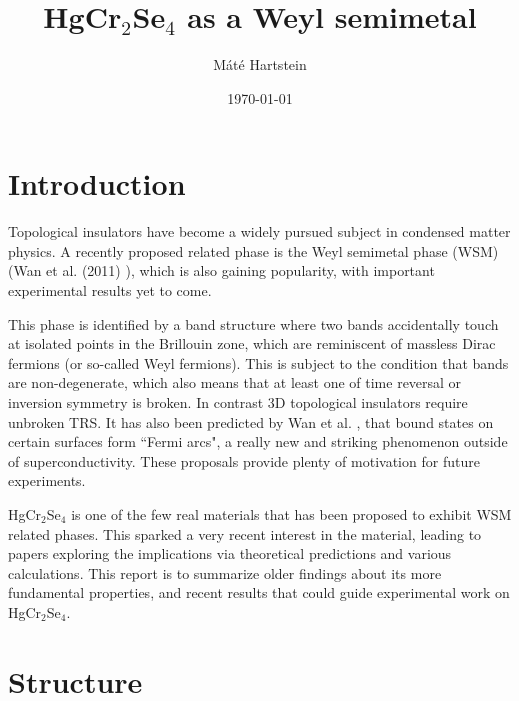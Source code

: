 \documentclass[preprint,pre,floats,aps,amsmath,amssymb]{revtex4}
\begin{document}
\title{HgCr$_2$Se$_4$ as a Weyl semimetal}
\author{M\'{a}t\'{e} Hartstein}
\date{\today}

\clearpage\maketitle
\thispagestyle{empty}


\section{Introduction}
\label{sec:intro}

Topological insulators have become a widely pursued subject in condensed matter physics. A recently proposed related phase is the Weyl semimetal phase (WSM) (Wan et al. (2011) \cite{wan}), which is also gaining popularity, with important experimental results yet to come.
 
This phase is identified by a band structure where two bands accidentally touch at isolated points in the Brillouin zone, which are reminiscent of massless Dirac fermions (or so-called Weyl fermions). This is subject to the condition that bands are non-degenerate, which also means that at least one of time reversal or inversion symmetry is broken. In contrast 3D topological insulators require unbroken TRS.
It has also been predicted by Wan et al. \cite{wan}, that bound states on certain surfaces form ``{Fermi arcs}", a really new and striking phenomenon outside of superconductivity. These proposals provide plenty of motivation for future experiments.
 
HgCr$_2$Se$_4$ is one of the few real materials that has been proposed to exhibit WSM related phases. This sparked a very recent interest in the material, leading to papers exploring the implications via theoretical predictions and various calculations. This report is to summarize older findings about its more fundamental properties, and recent results that could guide experimental work on HgCr$_2$Se$_4$.



\section{Structure}
\end{document}
